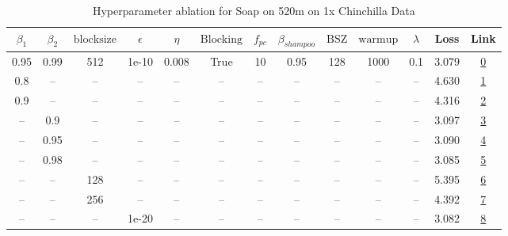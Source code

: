 \begin{table}[H]
\centering
\caption{Hyperparameter ablation for Soap on 520m on 1x Chinchilla Data}
\label{tab:ablation_soap_520m_1}
\begin{tabular}{ccccccccccccc}
\toprule
$\beta_1$ & $\beta_2$ & $\mathrm{block size}$ & $\epsilon$ & $\eta$ & $\mathrm{Blocking}$ & $f_{pc}$ & $\beta_{shampoo}$ & $\mathrm{BSZ}$ & $\mathrm{warmup}$ & $\lambda$ & Loss & Link \\
\midrule
0.95 & 0.99 & 512 & 1e-10 & 0.008 & True & 10 & 0.95 & 128 & 1000 & 0.1 & 3.079 & \href{https://wandb.ai/stanford-mercury/optimizer-scaling/runs/sweep-520m-10B-soape9baa74lr0.008-wd0.1-minlr0-warmup1000-b10.95-8d30a7}{0} \\
\midrule
0.8 & -- & -- & -- & -- & -- & -- & -- & -- & -- & -- & 4.630 & \href{https://wandb.ai/stanford-mercury/optimizer-scaling/runs/sweep-520m-10B-soapere54bb4blr0.008-wd0.1-minlr0-warmup1000-b10.-11ddc5}{1} \\
0.9 & -- & -- & -- & -- & -- & -- & -- & -- & -- & -- & 4.316 & \href{https://wandb.ai/stanford-mercury/optimizer-scaling/runs/sweep-520m-10B-soapeb38cf8lr0.008-wd0.1-minlr0-warmup1000-b10.9--fcc21b}{2} \\
-- & 0.9 & -- & -- & -- & -- & -- & -- & -- & -- & -- & 3.097 & \href{https://wandb.ai/stanford-mercury/optimizer-scaling/runs/sweep-520m-10B-soapere54bd5flr0.008-wd0.1-minlr0-warmup1000-b10.-4d6d54}{3} \\
-- & 0.95 & -- & -- & -- & -- & -- & -- & -- & -- & -- & 3.090 & \href{https://wandb.ai/stanford-mercury/optimizer-scaling/runs/sweep-520m-10B-soapere42c49clr0.008-wd0.1-minlr0-warmup1000-b10.-842d20}{4} \\
-- & 0.98 & -- & -- & -- & -- & -- & -- & -- & -- & -- & 3.085 & \href{https://wandb.ai/stanford-mercury/optimizer-scaling/runs/sweep-520m-10B-soapere2ba10alr0.008-wd0.1-minlr0-warmup1000-b10.-db6073}{5} \\
-- & -- & 128 & -- & -- & -- & -- & -- & -- & -- & -- & 5.395 & \href{https://wandb.ai/stanford-mercury/optimizer-scaling/runs/sweep-520m-10B-soaperef56540lr0.008-wd0.1-minlr0-warmup1000-b10.-996e37}{6} \\
-- & -- & 256 & -- & -- & -- & -- & -- & -- & -- & -- & 4.392 & \href{https://wandb.ai/stanford-mercury/optimizer-scaling/runs/sweep-520m-10B-soapere3d9681lr0.008-wd0.1-minlr0-warmup1000-b10.-0caed5}{7} \\
-- & -- & -- & 1e-20 & -- & -- & -- & -- & -- & -- & -- & 3.082 & \href{https://wandb.ai/stanford-mercury/optimizer-scaling/runs/sweep-520m-10B-soapef35af9lr0.008-wd0.1-minlr0-warmup1000-b10.95-ff91d3}{8} \\

\end{tabular}
\end{table}
